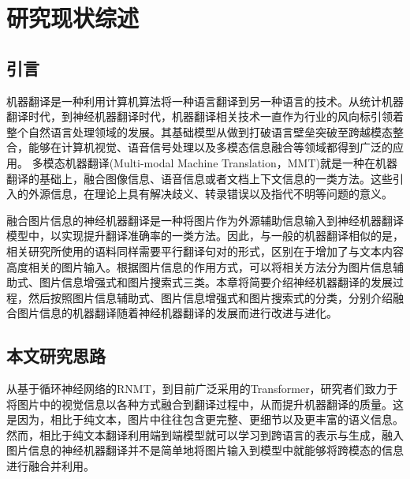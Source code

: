 \chapter{研究现状综述}\label{chap:relatedwork}

\section{引言}
机器翻译是一种利用计算机算法将一种语言翻译到另一种语言的技术。从统计机器翻译时代，到神经机器翻译时代，机器翻译相关技术一直作为行业的风向标引领着整个自然语言处理领域的发展。其基础模型从做到打破语言壁垒突破至跨越模态整合，能够在计算机视觉、语音信号处理以及多模态信息融合等领域都得到广泛的应用。
多模态机器翻译(Multi-modal Machine Translation，MMT)就是一种在机器翻译的基础上，融合图像信息、语音信息或者文档上下文信息的一类方法。这些引入的外源信息，在理论上具有解决歧义、转录错误以及指代不明等问题的意义。

融合图片信息的神经机器翻译是一种将图片作为外源辅助信息输入到神经机器翻译模型中，以实现提升翻译准确率的一类方法。因此，与一般的机器翻译相似的是，相关研究所使用的语料同样需要平行翻译句对的形式，区别在于增加了与文本内容高度相关的图片输入。根据图片信息的作用方式，可以将相关方法分为图片信息辅助式、图片信息增强式和图片搜索式三类。本章将简要介绍神经机器翻译的发展过程，然后按照图片信息辅助式、图片信息增强式和图片搜索式的分类，分别介绍融合图片信息的机器翻译随着神经机器翻译的发展而进行改进与进化。








\section{本文研究思路}

从基于循环神经网络的RNMT，到目前广泛采用的Transformer，研究者们致力于将图片中的视觉信息以各种方式融合到翻译过程中，从而提升机器翻译的质量。这是因为，相比于纯文本，图片中往往包含更完整、更细节以及更丰富的语义信息。然而，相比于纯文本翻译利用端到端模型就可以学习到跨语言的表示与生成，融入图片信息的神经机器翻译并不是简单地将图片输入到模型中就能够将跨模态的信息进行融合并利用。

